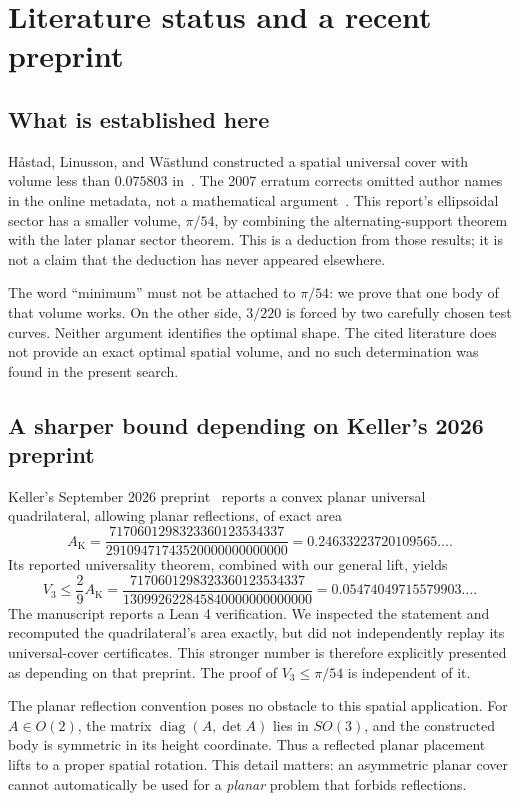 \section{Literature status and a recent preprint}\label{sec:literature}

\subsection{What is established here}
H\aa stad, Linusson, and W\"astlund constructed a spatial universal cover
with volume less than $0.075803$ in~\cite{HLW2001}. The 2007 erratum
corrects omitted author names in the online metadata, not a mathematical
argument~\cite{HLW2007}. This report's ellipsoidal sector has a smaller
volume, $\pi/54$, by combining the alternating-support theorem with the
later planar sector theorem. This is a deduction from those results;
it is not a claim that the deduction has never appeared elsewhere.

The word ``minimum'' must not be attached to $\pi/54$: we prove that
one body of that volume works. On the other side, $3/220$ is forced by
two carefully chosen test curves. Neither argument identifies the
optimal shape. The cited literature does not provide an exact optimal
spatial volume, and no such determination was found in the present search.

\subsection{A sharper bound depending on Keller's 2026 preprint}
Keller's September 2026 preprint~\cite{Keller2026} reports a convex planar
universal quadrilateral, allowing planar reflections, of exact area
\[
 A_{\mathrm K}=
 \frac{7170601298323360123534337}{29109471743520000000000000}
 =0.24633223720109565\ldots.
\]
Its reported universality theorem, combined with our general lift, yields
\[
 \boxed{V_3\le\frac29 A_{\mathrm K}
 =\frac{7170601298323360123534337}{130992622845840000000000000}
 =0.05474049715579903\ldots.}
\]
The manuscript reports a Lean 4 verification. We inspected the statement
and recomputed the quadrilateral's area exactly, but did not independently
replay its universal-cover certificates. This stronger number is therefore
explicitly presented as depending on that preprint. The proof of
$V_3\le\pi/54$ is independent of it.

The planar reflection convention poses no obstacle to this spatial
application. For $A\in O(2)$, the matrix
$\operatorname{diag}(A,\det A)$ lies in $SO(3)$, and the constructed
body is symmetric in its height coordinate. Thus a reflected planar
placement lifts to a proper spatial rotation. This detail matters:
an asymmetric planar cover cannot automatically be used for a
\emph{planar} problem that forbids reflections.

